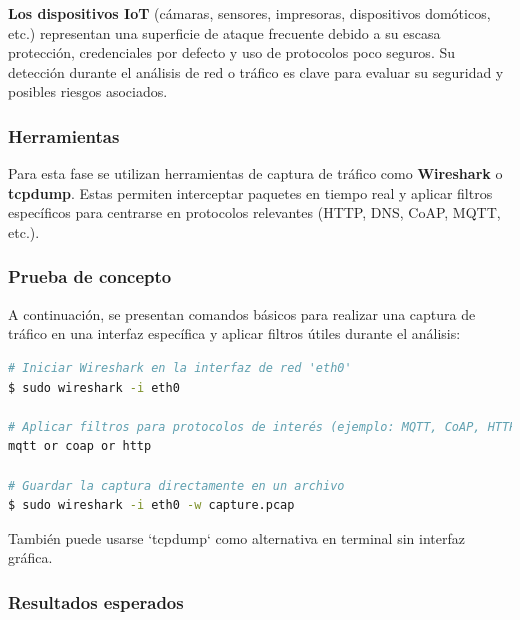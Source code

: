 \documentclass[a4paper, 11pt]{article}
\begin{document}
\textbf{Los dispositivos IoT} (cámaras, sensores, impresoras, dispositivos domóticos, etc.) representan una superficie de 
ataque frecuente debido a su escasa protección, credenciales por defecto y uso de protocolos poco seguros. Su detección durante 
el análisis de red o tráfico es clave para evaluar su seguridad y posibles riesgos asociados.

\vspace{0.5cm}
\subsubsection*{Herramientas}

Para esta fase se utilizan herramientas de captura de tráfico como \textbf{Wireshark} o \textbf{tcpdump}. Estas permiten interceptar paquetes en tiempo real y aplicar filtros específicos para centrarse en protocolos relevantes (HTTP, DNS, CoAP, MQTT, etc.).

\vspace{0.5cm}
\subsubsection*{Prueba de concepto}

A continuación, se presentan comandos básicos para realizar una captura de tráfico en una interfaz específica y aplicar filtros útiles durante el análisis:

\begin{lstlisting}[language=bash, style=terminalstyle, caption=Captura de tráfico con Wireshark]
# Iniciar Wireshark en la interfaz de red 'eth0'
$ sudo wireshark -i eth0

# Aplicar filtros para protocolos de interés (ejemplo: MQTT, CoAP, HTTP)
mqtt or coap or http

# Guardar la captura directamente en un archivo
$ sudo wireshark -i eth0 -w capture.pcap
\end{lstlisting}

También puede usarse `tcpdump` como alternativa en terminal sin interfaz gráfica.



\subsubsection*{Resultados esperados}
\end{document}
